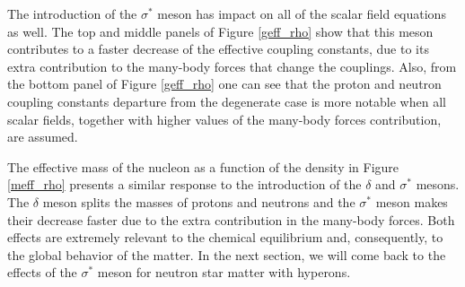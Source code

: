 \documentclass[twocolumn,showpacs,aps]{revtex4}
\begin{document}
The introduction of the $\sigma^*$ meson has impact on all of the scalar field equations as well.
The top and middle panels of Figure \ref{geff_rho} show that this meson contributes to a faster decrease of the effective coupling constants,
due to its extra contribution to the many-body forces that change the couplings.
Also, from the bottom panel of Figure \ref{geff_rho} one can see that
the proton and neutron coupling constants departure from the degenerate case is more notable
when all scalar fields, together with higher values of the many-body forces contribution, are assumed.

The effective mass of the nucleon as a function of the density in Figure \ref{meff_rho} 
presents a similar response to the introduction of the $\delta$ and $\sigma^*$ mesons.
The $\delta$ meson splits the masses of protons and neutrons and the $\sigma^*$ meson makes 
their decrease faster due to the extra contribution in the many-body forces.
Both effects are extremely relevant to the chemical equilibrium and, consequently, to the
global behavior of the matter. 
In the next section, we will come back to the effects of the $\sigma^*$ meson for neutron star matter with hyperons.
\end{document}
